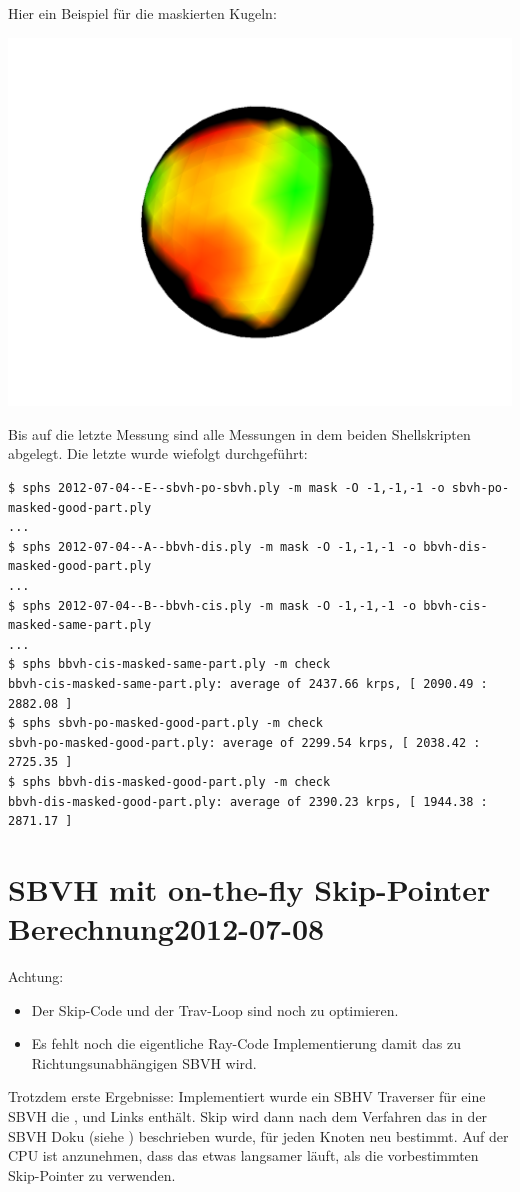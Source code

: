 \documentclass[a4paper,11pt]{article}
\begin{document}
\begin{itemize}
	Hier ein Beispiel für die maskierten Kugeln:
	\begin{center}
	\includegraphics[width=.45\textwidth]{2012-07-04/masked-sphere.png}\hfill
	\end{center}

\end{itemize}

Bis auf die letzte Messung sind alle Messungen in dem beiden Shellskripten abgelegt.
Die letzte wurde wiefolgt durchgeführt:

{\small
\begin{verbatim}
$ sphs 2012-07-04--E--sbvh-po-sbvh.ply -m mask -O -1,-1,-1 -o sbvh-po-masked-good-part.ply
...
$ sphs 2012-07-04--A--bbvh-dis.ply -m mask -O -1,-1,-1 -o bbvh-dis-masked-good-part.ply
...
$ sphs 2012-07-04--B--bbvh-cis.ply -m mask -O -1,-1,-1 -o bbvh-cis-masked-same-part.ply
...
$ sphs bbvh-cis-masked-same-part.ply -m check
bbvh-cis-masked-same-part.ply: average of 2437.66 krps, [ 2090.49 : 2882.08 ]
$ sphs sbvh-po-masked-good-part.ply -m check
sbvh-po-masked-good-part.ply: average of 2299.54 krps, [ 2038.42 : 2725.35 ]
$ sphs bbvh-dis-masked-good-part.ply -m check
bbvh-dis-masked-good-part.ply: average of 2390.23 krps, [ 1944.38 : 2871.17 ]
\end{verbatim}}




\section{SBVH mit on-the-fly Skip-Pointer Berechnung\hfill 2012-07-08}
Achtung: 
\begin{itemize}
\item Der Skip-Code und der Trav-Loop sind noch zu optimieren.
\item Es fehlt noch die eigentliche Ray-Code Implementierung damit das zu Richtungsunabhängigen SBVH wird.
\end{itemize}

Trotzdem erste Ergebnisse:
Implementiert wurde ein SBHV Traverser für eine SBVH die ,  und  Links enthält.
Skip wird dann nach dem Verfahren das in der SBVH Doku (siehe ) beschrieben wurde, für jeden
	Knoten neu bestimmt.
Auf der CPU ist anzunehmen, dass das etwas langsamer läuft, als die vorbestimmten Skip-Pointer zu verwenden.
\end{document}
